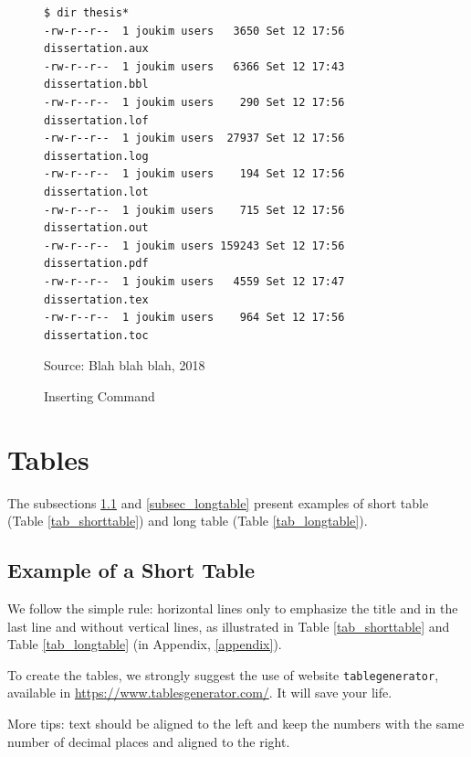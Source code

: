\begin{figure}[!htb]
\centering
\caption{Inserting Command} 
\begin{Verbatim}[fontsize=\small]
$ dir thesis*
-rw-r--r--  1 joukim users   3650 Set 12 17:56 dissertation.aux
-rw-r--r--  1 joukim users   6366 Set 12 17:43 dissertation.bbl
-rw-r--r--  1 joukim users    290 Set 12 17:56 dissertation.lof
-rw-r--r--  1 joukim users  27937 Set 12 17:56 dissertation.log
-rw-r--r--  1 joukim users    194 Set 12 17:56 dissertation.lot
-rw-r--r--  1 joukim users    715 Set 12 17:56 dissertation.out
-rw-r--r--  1 joukim users 159243 Set 12 17:56 dissertation.pdf
-rw-r--r--  1 joukim users   4559 Set 12 17:47 dissertation.tex
-rw-r--r--  1 joukim users    964 Set 12 17:56 dissertation.toc
\end{Verbatim} 
{\small Source: Blah blah blah, 2018} 
\label{fig_exemplocomando} 
\end{figure}

\section{Tables}
\label{sec_tabelas}

The subsections \ref{subsec_tabsimples} and \ref{subsec_longtable} present examples of  short table (Table \ref{tab_shorttable}) and long table (Table \ref{tab_longtable}).

\subsection{Example of a Short Table}
\label{subsec_tabsimples}

We follow the simple rule: horizontal lines only to emphasize the title and in the last line and without vertical lines, as illustrated in Table \ref{tab_shorttable} and Table \ref{tab_longtable} (in Appendix, \ref{appendix}).

To create the tables, we strongly suggest the use of website \texttt{tablegenerator}, available in \url{https://www.tablesgenerator.com/}. It will save your life.

More tips: text should be aligned to the left and keep the numbers with the same number of decimal places and aligned to the right.

